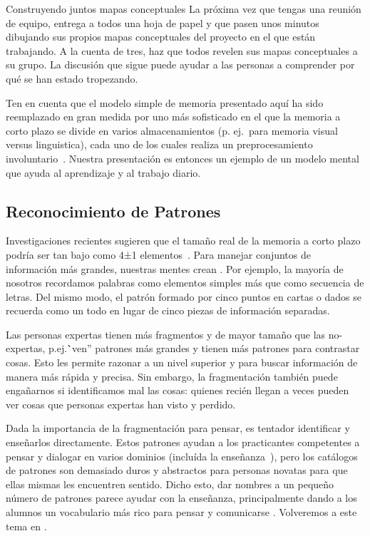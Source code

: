 
\begin{aside}{Construyendo juntos mapas conceptuales}
 La próxima vez que tengas una reunión de equipo,
 entrega a todos una hoja de papel
 y que pasen unos minutos dibujando sus propios mapas conceptuales del proyecto en el que  están trabajando.
  A la cuenta de tres,
  haz que todos revelen sus mapas conceptuales a su grupo.
  La discusión que sigue puede ayudar a las personas a comprender
  por qué se han estado tropezando.
\end{aside}

Ten en cuenta que el modelo simple de memoria presentado aquí ha sido reemplazado en gran medida por uno más sofisticado
en el que la memoria a corto plazo se divide en varios almacenamientos
(p. ej.\ para memoria visual versus linguistica),
cada uno de los cuales realiza un preprocesamiento involuntario~\cite{Mill2016a}.
Nuestra presentación es entonces un ejemplo de un modelo mental que ayuda al aprendizaje y al trabajo diario.

\subsection*{Reconocimiento de Patrones}

Investigaciones recientes sugieren que el tamaño real de la memoria a corto plazo 
podría ser tan bajo como 4±1 elementos~\cite{Dida2016}.
Para manejar conjuntos de información más grandes,
nuestras mentes crean .
Por ejemplo,
la mayoría de nosotros recordamos palabras como elementos simples más que como secuencia de letras.
Del mismo modo,
el patrón formado por cinco puntos en cartas o dados se recuerda como un todo 
en lugar de cinco piezas de información separadas.

Las personas expertas tienen más fragmentos y de mayor tamaño que las no-expertas,
p.ej.\``ven'' patrones más grandes y tienen más patrones para contrastar cosas.
Esto les permite razonar a un nivel superior
y para buscar información de manera más rápida y precisa.
Sin embargo,
la fragmentación también puede engañarnos si identificamos mal las cosas:
quienes recién llegan a veces pueden ver cosas que personas expertas han visto y perdido.

Dada la importancia de la fragmentación para pensar,
es tentador identificar 
y enseñarlos directamente.
Estos patrones ayudan a los practicantes competentes a pensar y dialogar en varios dominios (incluída la enseñanza~\cite{Berg2012}),
pero los catálogos de patrones son demasiado duros y abstractos para personas novatas para que ellas mismas les encuentren sentido.
Dicho esto,
dar nombres a un pequeño número de patrones parece ayudar con la enseñanza,
principalmente dando a los alumnos un vocabulario más rico para pensar y comunicarse \cite{Kuit2004,Byck2005,Saja2006}.
Volveremos a este tema en .

